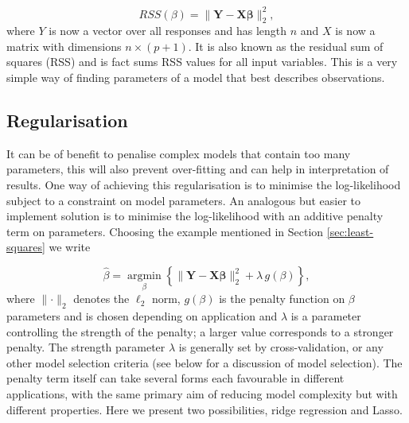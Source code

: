 
\begin{equation}
  \label{eq:rss-ls}
  RSS(\beta) = \lVert \mathbf{Y} - \mathbf{X}\mathbf{\beta}\lVert^2_2,
\end{equation}
where $Y$ is now a vector over all responses and has length $n$ and $X$ is now a matrix with dimensions $n \times (p + 1)$. It is also known as the residual sum of squares (RSS) and is fact sums RSS values for all input variables. This is a very simple way of finding parameters of a model that best describes observations.

\subsection{Regularisation}
\label{sec:penalisation}

It can be of benefit to penalise complex models that contain too many parameters, this will also prevent over-fitting and can help in interpretation of results. One way of achieving this regularisation is to  minimise the log-likelihood subject to a constraint on model parameters. An analogous but easier to implement solution is to minimise the log-likelihood with an additive penalty term on parameters. Choosing the example mentioned in Section \ref{sec:least-squares} we write

\begin{equation}
  \label{eq:pen-log-lik}
  \hat{\beta} = \underset{\beta}{\operatorname{argmin}}  \left\lbrace \lVert \mathbf{Y} - \mathbf{X}\mathbf{\beta}\lVert^2_2 + \lambda\, g(\beta) \right\rbrace,
\end{equation}
where $\lVert  \cdot \rVert_2$ denotes the $\ell_2$ norm, $g(\beta)$ is the penalty function on $\beta$ parameters and is chosen depending on application and $\lambda$ is a parameter controlling the strength of the penalty; a larger value corresponds to a stronger penalty. The strength parameter $\lambda$ is generally set by cross-validation, or any other model selection criteria (see below for a discussion of model selection). The penalty term itself can take several forms each favourable in different applications, with the same primary aim of reducing model complexity but with different properties. Here we present two possibilities, ridge regression and Lasso.


